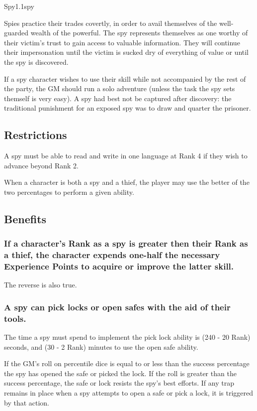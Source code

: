 \begin{skill}{Spy}{1.1}{spy}

Spies practice their trades covertly, in order to avail themselves of
the well-guarded wealth of the powerful. The spy represents themselves
as one worthy of their victim's trust to gain access to valuable
information.  They will continue their impersonation until the victim
is sucked dry of everything of value or until the spy is discovered.

If a spy character wishes to use their skill while not accompanied by
the rest of the party, the GM should run a solo adventure (unless the
task the spy sets themself is very easy).  A spy had best not be
captured after discovery: the traditional punishment for an exposed
spy was to draw and quarter the prisoner.

\subsection{Restrictions}

A spy must be able to read and write in one language at Rank 4 if they
wish to advance beyond Rank 2.

When a character is both a spy and a thief, the player may use the
better of the two percentages to perform a given ability.

\subsection{Benefits}

\subsubsection{If a character's Rank as a spy is greater then their
Rank as a thief, the character expends one-half the necessary
Experience Points to acquire or improve the latter skill.}

The reverse is also true.

\subsubsection{A spy can pick locks or open safes with the aid of their
tools.}
\label{spy:picklocks}

The time a spy must spend to implement the pick lock ability is (240 -
20 \x Rank) seconds, and (30 - 2 \x Rank) minutes to use the open safe
ability.

If the GM's roll on percentile dice is equal to or less than the
success percentage the spy has opened the safe or picked the lock. If
the roll is greater than the success percentage, the safe or lock
resists the spy's best efforts.  If any trap remains in place when a
spy attempts to open a safe or pick a lock, it is triggered by that
action.


\end{skill}
